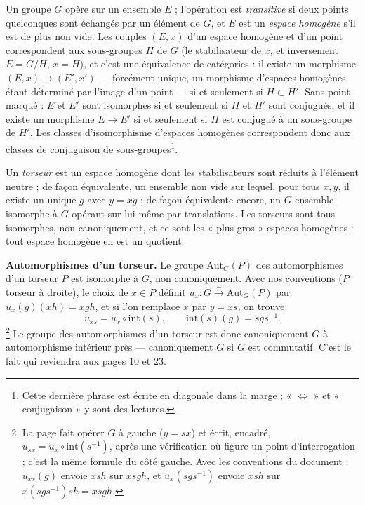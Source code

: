 \documentclass[11pt,a4paper]{article}
\begin{document}
Un groupe $G$ opère sur un ensemble $E$ ; l'opération est \emph{transitive}
si deux points quelconques sont échangés par un élément de $G$, et $E$ est un
\emph{espace homogène} s'il est de plus non vide. Les couples $(E, x)$ d'un
espace homogène et d'un point correspondent aux sous-groupes $H$ de $G$ (le
stabilisateur de $x$, et inversement $E = G/H$, $x = H$), et c'est une
équivalence de catégories : il existe un morphisme $(E, x) \to (E', x')$
--- forcément unique, un morphisme d'espaces homogènes étant déterminé par
l'image d'un point --- si et seulement si $H \subset H'$. Sans point marqué :
$E$ et $E'$ sont isomorphes si et seulement si $H$ et $H'$ sont conjugués, et
il existe un morphisme $E \to E'$ si et seulement si $H$ est conjugué à un
sous-groupe de $H'$. Les classes d'isomorphisme d'espaces homogènes
correspondent donc aux classes de conjugaison de sous-groupes\footnote{Cette
dernière phrase est écrite en diagonale dans la marge ; « $\Leftrightarrow$ »
et « conjugaison » y sont des lectures.}.

Un \emph{torseur} est un espace homogène dont les stabilisateurs sont réduits à
l'élément neutre ; de façon équivalente, un ensemble non vide sur lequel, pour
tous $x, y$, il existe un unique $g$ avec $y = x g$ ; de façon équivalente
encore, un $G$-ensemble isomorphe à $G$ opérant sur lui-même par translations.
Les torseurs sont tous isomorphes, non canoniquement, et ce sont les « plus
gros » espaces homogènes : tout espace homogène en est un quotient.

\textbf{Automorphismes d'un torseur.} Le groupe $\mathrm{Aut}_G(P)$ des
automorphismes d'un torseur $P$ est isomorphe à $G$, non canoniquement. Avec
nos conventions ($P$ torseur à droite), le choix de $x \in P$ définit
$u_x : G \xrightarrow{\sim} \mathrm{Aut}_G(P)$ par $u_x(g)(x h) = x g h$, et si
l'on remplace $x$ par $y = x s$, on trouve
\[
  u_{xs} = u_x \circ \mathrm{int}(s), \qquad \mathrm{int}(s)(g) = s g s^{-1}.
\]
\footnote{La page fait opérer $G$ à gauche ($y = s x$) et écrit, encadré,
$u_{sx} = u_x \circ \mathrm{int}(s^{-1})$, après une vérification où
figure un point d'interrogation ; c'est la même formule du côté gauche. Avec
les conventions du document : $u_{xs}(g)$ envoie $x s h$ sur $x s g h$, et
$u_x(s g s^{-1})$ envoie $x s h$ sur $x (s g s^{-1}) s h = x s g h$.}
Le groupe des automorphismes d'un torseur est donc canoniquement $G$ à
automorphisme intérieur près --- canoniquement $G$ si $G$ est commutatif.
C'est le fait qui reviendra aux pages 10 et 23.

\end{document}
